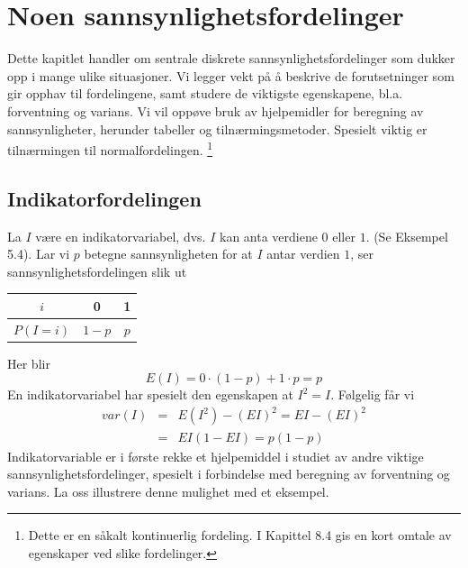 \chapter{Noen sannsynlighetsfordelinger}
\label{kap:sannsynlighetsfordelinger} %

Dette kapitlet handler om sentrale diskrete sannsynlighetsfordelinger
som dukker opp i mange ulike situasjoner.
Vi legger vekt på å beskrive de forutsetninger som gir opphav til
fordelingene, samt studere de viktigste egenskapene, bl.a. forventning og
varians. Vi vil oppøve bruk av hjelpemidler for beregning av
sannsynligheter, herunder tabeller og tilnærmingsmetoder.
Spesielt viktig er tilnærmingen til normalfordelingen.
\footnote{Dette er en såkalt kontinuerlig fordeling. I Kapittel 8.4 
gis en kort omtale av egenskaper ved slike fordelinger. }

\section{Indikatorfordelingen}

La $I$ være en indikatorvariabel, dvs. $I$ kan anta verdiene $0$
eller $1$. (Se Eksempel 5.4). Lar vi $p$ betegne sannsynligheten
for at $I$ antar verdien $1$, ser sannsynlighetsfordelingen slik ut
\begin{center}
\begin{tabular}{c|cc}
   $i$    &   0    &  1 \\ \hline 
 $P(I=i)$ & $1-p $ & $p$
\end{tabular}
\end{center}
\noindent Her blir
\[E(I)=0 \cdot (1-p) + 1 \cdot p = p \]
\noindent En indikatorvariabel har spesielt den egenskapen at $I^2=I$.
Følgelig får vi
\begin{eqnarray*}
 var(I)&=&E(I^2)-{(EI)}^2=EI-{(EI)}^2 \\
       &=&EI(1-EI)=p(1-p)
\end{eqnarray*}
\noindent Indikatorvariable er i første rekke et hjelpemiddel i studiet av
andre viktige sannsynlighetsfordelinger, spesielt i forbindelse
med beregning av forventning og varians. La oss illustrere denne mulighet
med et eksempel. \\

